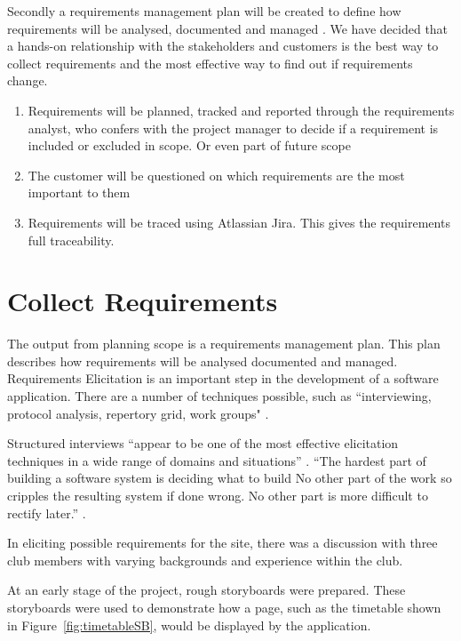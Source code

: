 Secondly a requirements management plan will be created to define how requirements will be analysed, documented and managed \parencite{pmbok}. We have decided that a hands-on relationship with the stakeholders and customers is the best way to collect requirements and the most effective way to find out if requirements change.


\begin{enumerate}
\item Requirements will be planned, tracked and reported through the requirements analyst, who confers with the project manager to decide if a requirement is included or excluded in scope. Or even part of future scope
\item The customer will be questioned on which requirements are the most important to them
\item Requirements will be traced using Atlassian Jira. This gives the requirements full traceability.
\end{enumerate}


\section{Collect Requirements}

The output from planning scope is a requirements management plan. This plan describes how requirements will be analysed documented and managed.
Requirements Elicitation is an important step in the development of a software application. There are a number of techniques possible, such as “interviewing, protocol analysis, repertory grid, work groups" \parencite{req}. 

Structured interviews “appear to be one of the most effective elicitation techniques in a wide range of domains and situations” \parencite{req}.
“The hardest part of building a software system is deciding what to build No other part of the work so cripples the resulting system if done wrong. No other part is more difficult to rectify later.” \parencite{brooks}.

In eliciting possible requirements for the site, there was a discussion with three club members with varying backgrounds and experience within the club.

At an early stage of the project, rough storyboards were prepared. These storyboards were used to demonstrate how a page, such as the timetable shown in Figure~\ref{fig:timetableSB}, would be displayed by the application. 

